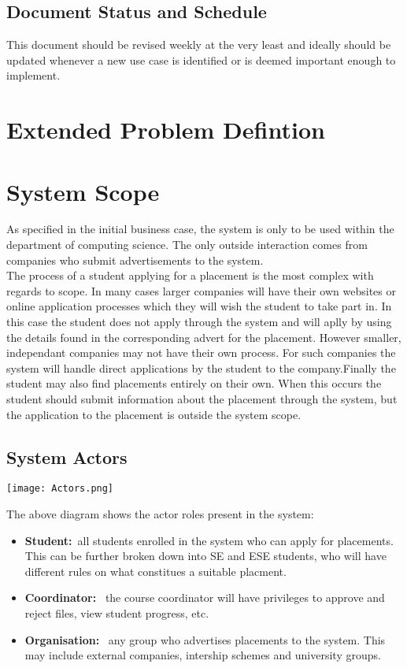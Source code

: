 \documentclass{l3deliverable}
\begin{document}
\subsection{Document Status and Schedule}
This document should be revised weekly at the very least and ideally should be updated whenever a new use case is identified or is deemed important enough to implement.

\newpage
\section{Extended Problem Defintion}

\newpage
\section{System Scope}
As specified in the initial business case, the system is only to be used within the department of computing science. The only outside interaction comes from companies who
submit advertisements to the system. \\
The process of a student applying for a placement is the most complex with regards to scope. In many cases larger companies will have their own websites or online application
processes which they will wish the student to take part in. In this case the student does not apply through the system and will aplly by using the details found in the corresponding
advert for the placement. However smaller, independant companies may not have their own process. For such companies the system will handle direct applications by the student to 
the company.Finally the student may also find placements entirely on their own. When this occurs the student should submit information about the placement through the system, but
the application to the placement is outside the system scope.
\\


\subsection{System Actors}
\texttt{[image: Actors.png]}

The above diagram shows the actor roles present in the system:
\begin{itemize}
\item{\textbf{Student:}\ all students enrolled in the system who can apply for placements. This can be further broken down into SE and ESE students, who will have
different rules on what constitues a suitable placment.}
\item{\textbf{Coordinator: }\ the course coordinator will have privileges to approve and reject files, view student progress, etc.}
\item{\textbf{Organisation: }\ any group who advertises placements to the system. This may include external companies, intership schemes and university groups.}
\end{itemize}
\end{document}
